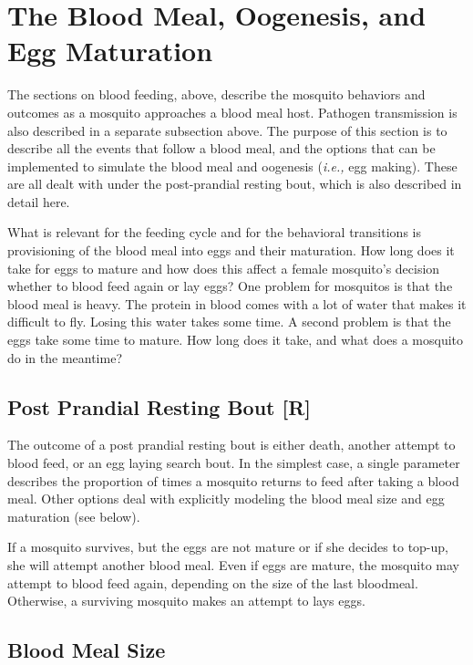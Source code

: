 \documentclass{article}
\newcommand{\ie}{{\em i.e., }}
\begin{document}
\section{The Blood Meal, Oogenesis, and Egg Maturation}

The sections on blood feeding, above, describe the mosquito behaviors and outcomes as a mosquito approaches a blood meal host. Pathogen transmission is also described in a separate subsection above. The purpose of this section is to describe all the events that follow a blood meal, and the options that can be implemented to simulate the blood meal and oogenesis (\ie egg making). These are all dealt with under the post-prandial resting bout, which is also described in detail here. 

What is relevant for the feeding cycle and for the behavioral transitions is provisioning of the blood meal into eggs and their maturation. How long does it take for eggs to mature and how does this affect a female mosquito's decision whether to blood feed again or lay eggs? One problem for mosquitos is that the blood meal is heavy. The protein in blood comes with a lot of water that makes it difficult to fly.  Losing this water takes some time. A second problem is that the eggs take some time to mature. How long does it take, and what does a mosquito do in the meantime? 

\subsection{Post Prandial Resting Bout [R]}

The outcome of a post prandial resting bout is either death,
another attempt to blood feed, or an egg laying search bout. 
In the simplest case, a single parameter describes the 
proportion of times a mosquito returns to feed after taking 
a blood meal. Other options deal with explicitly modeling the 
blood meal size and egg maturation (see below). 

If a mosquito survives, but the eggs are not mature or if she
decides to top-up, she will attempt another blood meal. Even if
eggs are mature, the mosquito may attempt to blood feed again,
depending on the size of the last bloodmeal. Otherwise, a
surviving mosquito makes an attempt to lays eggs.

\subsection{Blood Meal Size}
\end{document}
